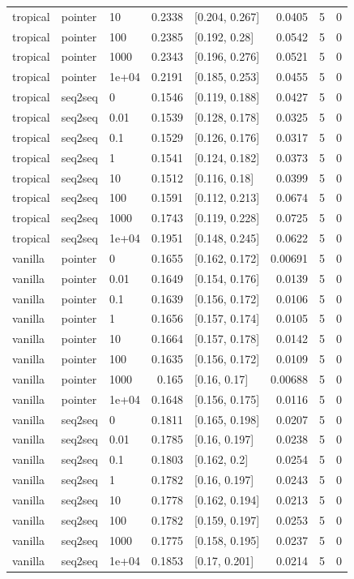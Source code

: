 \documentclass[10pt]{article}
\begin{document}
{\begin{longtable}{lllrlrrr}
tropical & pointer & 10 & 0.2338 & [0.204, 0.267] & 0.0405 & 5 & 0\\
tropical & pointer & 100 & 0.2385 & [0.192, 0.28] & 0.0542 & 5 & 0\\
tropical & pointer & 1000 & 0.2343 & [0.196, 0.276] & 0.0521 & 5 & 0\\
tropical & pointer & 1e+04 & 0.2191 & [0.185, 0.253] & 0.0455 & 5 & 0\\
tropical & seq2seq & 0 & 0.1546 & [0.119, 0.188] & 0.0427 & 5 & 0\\
tropical & seq2seq & 0.01 & 0.1539 & [0.128, 0.178] & 0.0325 & 5 & 0\\
tropical & seq2seq & 0.1 & 0.1529 & [0.126, 0.176] & 0.0317 & 5 & 0\\
tropical & seq2seq & 1 & 0.1541 & [0.124, 0.182] & 0.0373 & 5 & 0\\
tropical & seq2seq & 10 & 0.1512 & [0.116, 0.18] & 0.0399 & 5 & 0\\
tropical & seq2seq & 100 & 0.1591 & [0.112, 0.213] & 0.0674 & 5 & 0\\
tropical & seq2seq & 1000 & 0.1743 & [0.119, 0.228] & 0.0725 & 5 & 0\\
tropical & seq2seq & 1e+04 & 0.1951 & [0.148, 0.245] & 0.0622 & 5 & 0\\
vanilla & pointer & 0 & 0.1655 & [0.162, 0.172] & 0.00691 & 5 & 0\\
vanilla & pointer & 0.01 & 0.1649 & [0.154, 0.176] & 0.0139 & 5 & 0\\
vanilla & pointer & 0.1 & 0.1639 & [0.156, 0.172] & 0.0106 & 5 & 0\\
vanilla & pointer & 1 & 0.1656 & [0.157, 0.174] & 0.0105 & 5 & 0\\
vanilla & pointer & 10 & 0.1664 & [0.157, 0.178] & 0.0142 & 5 & 0\\
vanilla & pointer & 100 & 0.1635 & [0.156, 0.172] & 0.0109 & 5 & 0\\
vanilla & pointer & 1000 & 0.165 & [0.16, 0.17] & 0.00688 & 5 & 0\\
vanilla & pointer & 1e+04 & 0.1648 & [0.156, 0.175] & 0.0116 & 5 & 0\\
vanilla & seq2seq & 0 & 0.1811 & [0.165, 0.198] & 0.0207 & 5 & 0\\
vanilla & seq2seq & 0.01 & 0.1785 & [0.16, 0.197] & 0.0238 & 5 & 0\\
vanilla & seq2seq & 0.1 & 0.1803 & [0.162, 0.2] & 0.0254 & 5 & 0\\
vanilla & seq2seq & 1 & 0.1782 & [0.16, 0.197] & 0.0243 & 5 & 0\\
vanilla & seq2seq & 10 & 0.1778 & [0.162, 0.194] & 0.0213 & 5 & 0\\
vanilla & seq2seq & 100 & 0.1782 & [0.159, 0.197] & 0.0253 & 5 & 0\\
vanilla & seq2seq & 1000 & 0.1775 & [0.158, 0.195] & 0.0237 & 5 & 0\\
vanilla & seq2seq & 1e+04 & 0.1853 & [0.17, 0.201] & 0.0214 & 5 & 0\\
\bottomrule
\end{longtable}
}
\end{document}
